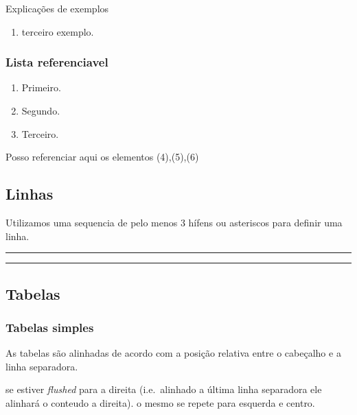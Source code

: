 Explicações de exemplos

\begin{enumerate}
\def\labelenumi{(\arabic{enumi})}
\setcounter{enumi}{2}
\tightlist
\item
  terceiro exemplo.
\end{enumerate}

\hypertarget{lista-referenciavel}{%
\subsubsection{Lista referenciavel}\label{lista-referenciavel}}

\begin{enumerate}
\def\labelenumi{(\arabic{enumi})}
\setcounter{enumi}{3}
\tightlist
\item
  Primeiro.
\item
  Segundo.
\item
  Terceiro.
\end{enumerate}

Posso referenciar aqui os elementos (4),(5),(6)

\hypertarget{linhas}{%
\subsection{Linhas}\label{linhas}}

Utilizamos uma sequencia de pelo menos 3 hífens ou asteriscos para
definir uma linha.

\begin{center}\rule{0.5\linewidth}{\linethickness}\end{center}

\begin{center}\rule{0.5\linewidth}{\linethickness}\end{center}

\hypertarget{tabelas}{%
\subsection{Tabelas}\label{tabelas}}

\hypertarget{tabelas-simples}{%
\subsubsection{Tabelas simples}\label{tabelas-simples}}

As tabelas são alinhadas de acordo com a posição relativa entre o
cabeçalho e a linha separadora.

se estiver \emph{flushed} para a direita (i.e.~alinhado a última linha
separadora ele alinhará o conteudo a direita). o mesmo se repete para
esquerda e centro.

